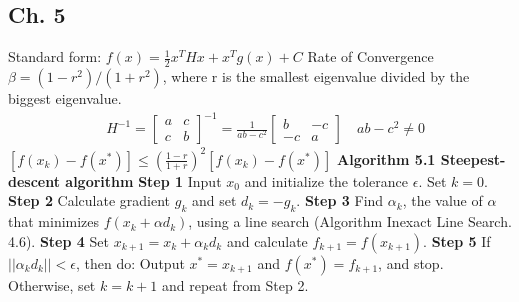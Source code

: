 \begin{multicols}{3}
\section{Ch. 5}
Standard form: $f(x)=\frac{1}{2}x^T H x + x^T g(x) + C$ \newline 
Rate of Convergence $\beta = (1-r^2)/(1+r^2)$, where r is the smallest eigenvalue divided by the biggest eigenvalue. \newline
\begin{align*}
& H^{-1}=\begin{bmatrix}
a & c \\
c & b 
\end{bmatrix}^{-1}
=
\frac{1}{ab-c^2}
\begin{bmatrix}
b & -c \\
-c & a
\end{bmatrix} \quad ab-c^2 \neq 0
\end{align*}
$[f(x_k)-f(x^*)]\leq \left(\frac{1-r}{1+r}\right)^2[f(x_k)-f(x^*)]$ \newline
\textbf{Algorithm 5.1 Steepest-descent algorithm} \newline
\textbf{Step 1}  \newline
Input $x_0$ and initialize the tolerance $\epsilon$. \newline
Set $k = 0$. \newline
\textbf{Step 2} \newline
Calculate gradient $g_k$ and set $d_k=-g_k$. \newline
\textbf{Step 3} \newline
Find $\alpha_k$, the value of $\alpha$ that minimizes $f(x_k + \alpha d_k)$, using a line search (Algorithm Inexact Line Search. 4.6). \newline
\textbf{Step 4} \newline
Set $x_{k+1} = x_k + \alpha_k d_k$ and calculate $f_{k+1} = f(x_{k+1})$. \newline
\textbf{Step 5}  \newline
If $||\alpha_k d_k|| < \epsilon$, then do: \newline
Output $x^* = x_{k+1}$ and $f(x^*) = f_{k+1}$, and stop. \newline
Otherwise, set $k = k + 1$ and repeat from Step 2. \newline 


\end{multicols}
